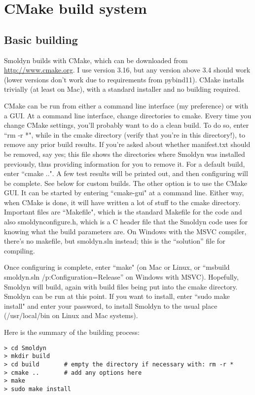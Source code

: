 \documentclass {scrbook}
\begin{document}
\section{CMake build system}

\subsection{Basic building}
Smoldyn builds with CMake, which can be downloaded from \url{http://www.cmake.org}. I use version 3.16, but any version above 3.4 should work (lower versions don't work due to requirements from pybind11). CMake installs trivially (at least on Mac), with a standard installer and no building required.

CMake can be run from either a command line interface (my preference) or with a GUI. At a command line interface, change directories to cmake. Every time you change CMake settings, you'll probably want to do a clean build. To do so, enter ``rm -r *", while in the cmake directory (verify that you're in this directory!), to remove any prior build results. If you're asked about whether manifest.txt should be removed, say yes; this file shows the directories where Smoldyn was installed previously, thus providing information for you to remove it. For a default build, enter ``cmake ..". A few test results will be printed out, and then configuring will be complete. See below for custom builds. The other option is to use the CMake GUI. It can be started by entering ``cmake-gui" at a command line. Either way, when CMake is done, it will have written a lot of stuff to the cmake directory. Important files are ``Makefile", which is the standard Makefile for the code and also smoldynconfigure.h, which is a C header file that the Smoldyn code uses for knowing what the build parameters are. On Windows with the MSVC compiler, there's no makefile, but smoldyn.sln instead; this is the ``solution'' file for compiling.

Once configuring is complete, enter ``make" (on Mac or Linux, or ``msbuild smoldyn.sln /p:Configuration=Release'' on Windows with MSVC). Hopefully, Smoldyn will build, again with build files being put into the cmake directory. Smoldyn can be run at this point. If you want to install, enter ``sudo make install" and enter your password, to install Smoldyn to the usual place (/usr/local/bin on Linux and Mac systems).

Here is the summary of the building process:

\begin{lstlisting}
> cd Smoldyn
> mkdir build
> cd build       # empty the directory if necessary with: rm -r *
> cmake ..	     # add any options here
> make
> sudo make install
\end{lstlisting}
\end{document}
